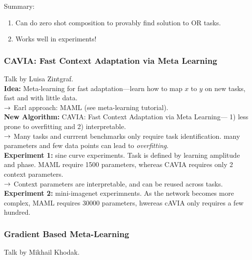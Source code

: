 Summary:
\begin{enumerate}
    \item Can do zero shot composition to provably find solution to OR tasks.
    \item Works well in experiments!
\end{enumerate}

\spacerule
\subsubsection{CAVIA: Fast Context Adaptation via Meta Learning~\cite{zintgraf2019fast}}

Talk by Luisa Zintgraf. \\

{\bf Idea:} Meta-learning for fast adaptation---learn how to map $x$ to $y$ on new tasks, fast and with little data. \\

$\rightarrow$ Earl approach: MAML (see meta-learning tutorial). \\

{\bf New Algorithm:} CAVIA: Fast Context Adaptation via Meta Learning--- 1) less prone to overfitting and 2) interpretable. \\

$\rightarrow$ Many tasks and currrent benchmarks only require task identification. many parameters and few data points can lead to {\it overfitting}. \\

{\bf Experiment 1:} sine curve experiments. Task is defined by learning amplitude and phase. MAML require 1500 parameters, whereas CAVIA requires only 2 context parameters. \\

$\rightarrow$ Context parameters are interpretable, and can be reused across tasks. \\

{\bf Experiment 2:} mini-imagenet experimnents. As the network becomes more complex, MAML requires 30000 parameters, hwereas cAVIA only requires a few hundred. \\

\spacerule

\subsubsection{Gradient Based Meta-Learning~\cite{khodak2019adaptive}}

Talk by Mikhail Khodak. \\

